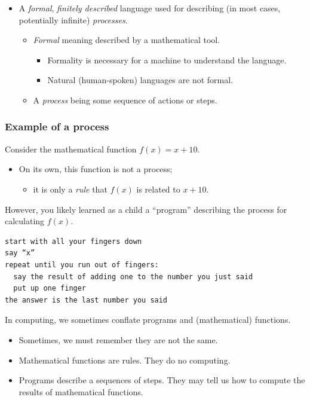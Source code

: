 \documentclass[11pt]{article}
\theoremstyle{definition}
\begin{document}
\begin{itemize}
\item A \emph{formal}, \emph{finitely described} language used for
describing (in most cases, potentially infinite) \emph{processes}.
\begin{itemize}
\item \emph{Formal} meaning described by a mathematical tool.
\begin{itemize}
\item Formality is necessary for a machine to understand the language.
\item Natural (human-spoken) languages are not formal.
\end{itemize}
\item A \emph{process} being some sequence of actions or steps.
\end{itemize}
\end{itemize}

\subsubsection{Example of a process}
\label{sec:org5f1ccbc}

Consider the mathematical function \(f(x) = x + 10\).
\begin{itemize}
\item On its own, this function is not a process;
\begin{itemize}
\item it is only a \emph{rule} that \(f(x)\) is related to \(x + 10\).
\end{itemize}
\end{itemize}

However, you likely learned as a child
a “program” describing the process for calculating \(f(x)\).
\begin{verbatim}
start with all your fingers down
say “x” 
repeat until you run out of fingers:
  say the result of adding one to the number you just said
  put up one finger
the answer is the last number you said
\end{verbatim}

In computing, we sometimes conflate programs and (mathematical) functions.
\begin{itemize}
\item Sometimes, we must remember they are not the same.
\item Mathematical functions are rules. They do no computing.
\item Programs describe a sequences of steps.
They may tell us how to compute
the results of mathematical functions.
\end{itemize}
\end{document}
